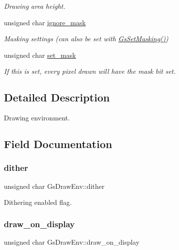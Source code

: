 \begin{DoxyCompactItemize}
\begin{DoxyCompactList}\small\item\em Drawing area height. \end{DoxyCompactList}\item 
unsigned char \hyperlink{structGsDrawEnv_a4702f6a0dc9e014fffc7c83a5d94dda2}{ignore\+\_\+mask}
\begin{DoxyCompactList}\small\item\em Masking settings (can also be set with \hyperlink{psxgpu_8h_a3227c6006b054de313ff717ee00d8314}{Gs\+Set\+Masking()}) \end{DoxyCompactList}\item 
unsigned char \hyperlink{structGsDrawEnv_a9c7f33c1da333d45f478dc9eb77bf0a1}{set\+\_\+mask}
\begin{DoxyCompactList}\small\item\em If this is set, every pixel drawn will have the mask bit set. \end{DoxyCompactList}\end{DoxyCompactItemize}


\subsection{Detailed Description}
Drawing environment. 

\subsection{Field Documentation}
\mbox{\label{structGsDrawEnv_aaaed8f80f352d5e88563072418176aa3}} 
\subsubsection{\texorpdfstring{dither}{dither}}
{\footnotesize\ttfamily unsigned char Gs\+Draw\+Env\+::dither}



Dithering enabled flag. 

\mbox{\label{structGsDrawEnv_a308c7cb65b6076160c23905b2946fcfe}} 
\subsubsection{\texorpdfstring{draw\+\_\+on\+\_\+display}{draw\_on\_display}}
{\footnotesize\ttfamily unsigned char Gs\+Draw\+Env\+::draw\+\_\+on\+\_\+display}



